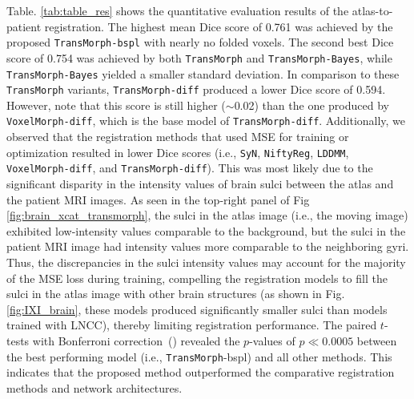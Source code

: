 \documentclass[times,twocolumn,final]{elsarticle}
\begin{document}
Table. \ref{tab:table_res} shows the quantitative evaluation results of the atlas-to-patient registration. The highest mean Dice score of 0.761 was achieved by the proposed \texttt{TransMorph-bspl} with nearly no folded voxels. The second best Dice score of 0.754 was achieved by both \texttt{TransMorph} and \texttt{TransMorph-Bayes}, while \texttt{TransMorph-Bayes} yielded a smaller standard deviation. In comparison to these \texttt{TransMorph} variants, \texttt{TransMorph-diff} produced a lower Dice score of 0.594. However, note that this score is still higher ($\sim$0.02) than the one produced by \texttt{VoxelMorph-diff}, which is the base model of \texttt{TransMorph-diff}. Additionally, we observed that the registration methods that used MSE for training or optimization resulted in lower Dice scores (i.e., \texttt{SyN}, \texttt{NiftyReg}, \texttt{LDDMM}, \texttt{VoxelMorph-diff}, and \texttt{TransMorph-diff}). This was most likely due to the significant disparity in the intensity values of brain sulci between the atlas and the patient MRI images. As seen in the top-right panel of Fig \ref{fig:brain_xcat_transmorph}, the sulci in the atlas image (i.e., the moving image) exhibited low-intensity values comparable to the background, but the sulci in the patient MRI image had intensity values more comparable to the neighboring gyri. Thus, the discrepancies in the sulci intensity values may account for the majority of the MSE loss during training, compelling the registration models to fill the sulci in the atlas image with other brain structures (as shown in Fig. \ref{fig:IXI_brain}, these models produced significantly smaller sulci than models trained with LNCC), thereby limiting registration performance. The paired $t$-tests with Bonferroni correction~(\cite{armstrong2014use}) revealed the $p$-values of $p\ll0.0005$ between the best performing model (i.e., \texttt{TransMorph}-bspl) and all other methods. This indicates that the proposed method outperformed the comparative registration methods and network architectures.
\end{document}
